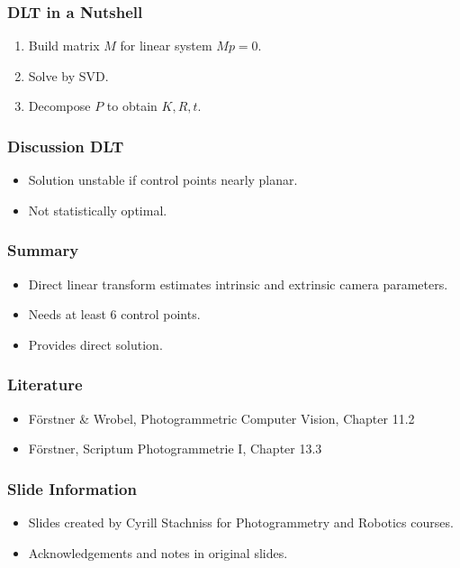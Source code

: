 \begin{frame}
  \frametitle{DLT in a Nutshell}
  \begin{enumerate}
    \item Build matrix $M$ for linear system $M p = 0$.
    \item Solve by SVD.
    \item Decompose $P$ to obtain $K,R,t$.
  \end{enumerate}
\end{frame}

\begin{frame}
  \frametitle{Discussion DLT}
  \begin{itemize}
    \item Solution unstable if control points nearly planar.
    \item Not statistically optimal.
  \end{itemize}
\end{frame}

\begin{frame}
  \frametitle{Summary}
  \begin{itemize}
    \item Direct linear transform estimates intrinsic and extrinsic camera parameters.
    \item Needs at least 6 control points.
    \item Provides direct solution.
  \end{itemize}
\end{frame}

\begin{frame}
  \frametitle{Literature}
  \begin{itemize}
    \item Förstner \& Wrobel, Photogrammetric Computer Vision, Chapter 11.2
    \item Förstner, Scriptum Photogrammetrie I, Chapter 13.3
  \end{itemize}
\end{frame}

\begin{frame}
  \frametitle{Slide Information}
  \begin{itemize}
    \item Slides created by Cyrill Stachniss for Photogrammetry and Robotics courses.
    \item Acknowledgements and notes in original slides.
  \end{itemize}
\end{frame}


